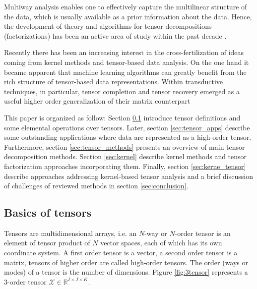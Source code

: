 \documentclass[letterpaper,12pt]{article}
\begin{document}
Multiway analysis enables one to effectively capture the multilinear structure of the data, which is usually available as a prior information about the data. Hence, the development of theory and algorithms for tensor decompositions (factorizations) has been an active area of study within the past decade  \cite{Kolda2009,Cichocki2015}.

Recently there has been an increasing interest in the cross-fertilization of ideas coming from kernel methods and tensor-based data analysis. On the one hand it became apparent that machine learning algorithms can greatly benefit from the rich structure of tensor-based data representations. %
Within transductive techniques, in particular, tensor completion and tensor recovery emerged as a useful higher order generalization of their matrix counterpart %

This paper is organized as follow: Section \ref{sec:basic_tensors} introduce tensor definitions and some elemental operations over tensors. Later, section \ref{sec:tensor_apps} describe some outstanding applications where data are represented as a high-order tensor. Furthermore, section \ref{sec:tensor_methods} presents an overview of main tensor decomposition  methods. Section \ref{sec:kernel} describe kernel methods and tensor factorization approaches incorporating them. Finally, section \ref{sec:kerne_tensor} describe approaches addressing kernel-based tensor analysis and a brief discussion of challenges of reviewed methods in section \ref{sec:conclusion}.

\subsection{Basics of tensors}\label{sec:basic_tensors}

Tensors are multidimensional arrays, i.e. an $N$-way or $N$-order tensor is an element of tensor product of $N$ vector spaces, each of which has its own coordinate system. A first order tensor is a vector, a second order tensor is a matrix, tensors of higher order are called high-order tensors. The order (ways or modes) of a tensor is the number of dimensions. Figure \ref{fig:3tensor} represents a 3-order tensor $\mathcal{X}\in\mathbb{R}^{I\times J\times K}$.
\end{document}
